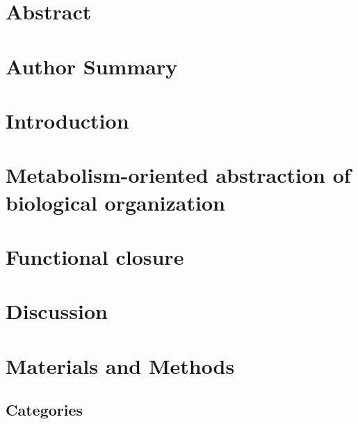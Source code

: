 





\listoftodos

\section*{Abstract}

\section*{Author Summary}

%

\section*{Introduction}


\section*{Metabolism-oriented abstraction of biological organization}


\section*{Functional closure}


\section*{Discussion}



\section*{Materials and Methods}
\subsection*{Categories}


%
